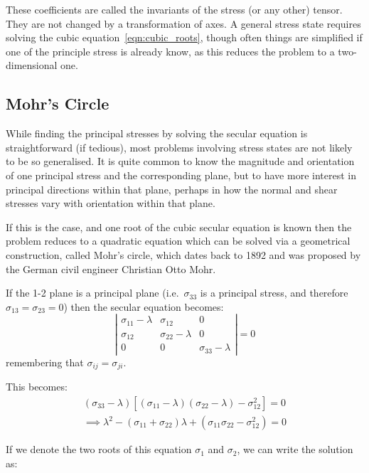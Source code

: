 These coefficients are called the invariants of the stress (or any other) tensor. They are not changed by a transformation of axes. A general stress state requires solving the cubic equation~\ref{eqn:cubic_roots}, though often things are simplified if one of the principle stress is already know, as this reduces the problem to a two-dimensional one.



\subsection{Mohr's Circle}

While finding the principal stresses by solving the secular equation is straightforward (if tedious), most problems involving stress states are not likely to be so generalised. It is quite common to know the magnitude and orientation of one principal stress and the corresponding plane, but to have more interest in principal directions within that plane, perhaps in how the normal and shear stresses vary with orientation within that plane.

If this is the case, and one root of the cubic secular equation is known then the problem reduces to a quadratic equation which can be solved via a geometrical construction, called Mohr's circle, which dates back to 1892 and was proposed by the German civil engineer Christian Otto Mohr.

If the 1-2 plane is a principal plane (i.e.\ $\sigma_{33}$ is a principal stress, and therefore $\sigma_{13} = \sigma_{23} = 0$) then the secular equation becomes:
\begin{equation}
\left| \begin{matrix}
\sigma_{11} - \lambda & \sigma_{12} & 0 \\
\sigma_{12} & \sigma_{22} - \lambda & 0 \\
0 & 0 & \sigma_{33}-\lambda
\end{matrix}\right| = 0
\end{equation}
remembering that $\sigma_{ij} = \sigma_{ji}$.

This becomes:
\begin{align}
(\sigma_{33}- \lambda)[(\sigma_{11} - \lambda)(\sigma_{22} - \lambda) - \sigma_{12}^2] = 0 \nonumber \\
\implies \lambda^2 - (\sigma_{11} + \sigma_{22})\lambda + (\sigma_{11}\sigma_{22} - \sigma_{12}^2) = 0
\end{align}

If we denote the two roots of this equation $\sigma_1$ and $\sigma_2$, we can write the solution as:


